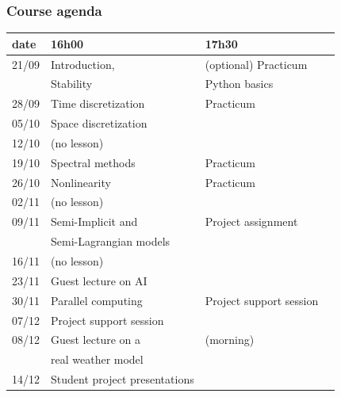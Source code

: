 \documentclass[aspectratio=149,9pt]{beamer}
\begin{document}
%
\begin{frame}
	\frametitle{Course agenda}
	\vspace*{-5mm}
	\begin{center}
        \small
		\def\arraystretch{1.3}
		\begin{tabular}{l|lll}
			date	&	16h00	&	17h30 \\
		\hline
			21/09 	& Introduction,             &	(optional) Practicum	\\[-4pt]
					& Stability	                &   Python basics           \\
			28/09	& Time discretization		&   Practicum               \\
			05/10	& Space discretization		&		                    \\
			12/10	& (no lesson) \\
			19/10	& Spectral methods       	&	Practicum				\\
			26/10	& Nonlinearity      		&	Practicum				\\
			02/11	& (no lesson) \\
			09/11	& Semi-Implicit and		 	&	Project assignment		\\[-4pt]
					& Semi-Lagrangian models	&	       \\
		\hline
			16/11	& (no lesson) \\
			23/11	& Guest lecture on AI \\
			30/11	& Parallel computing &	Project support session \\
			07/12	& Project support session \\
			08/12	& Guest lecture on a & (morning)\\[-4pt]
                    & real weather model \\
			14/12	& Student project presentations
		\end{tabular}
		\def\arraystretch{1}
	\end{center}
\end{frame}
%
%
\end{document}
